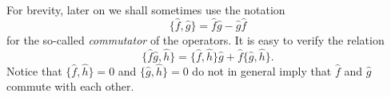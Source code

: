 For brevity, later on we shall sometimes use the notation
\begin{equation}
  \{\hat f,\hat g\}=\hat f\hat g-\hat g\hat f
  \tag{4.8}
\end{equation}
for the so-called \emph{commutator} of the operators. It is easy to verify the
relation
\begin{equation}
  \{\hat f\hat g,\hat h\}
  =\{\hat f,\hat h\}\hat g+\hat f\{\hat g,\hat h\}.
  \tag{4.9}
\end{equation}
Notice that $\{\hat f,\hat h\}=0$ and $\{\hat g,\hat h\}=0$ do not in general
imply that $\hat f$ and $\hat g$ commute with each other.
